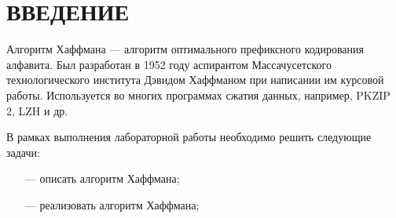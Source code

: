 \chapter*{ВВЕДЕНИЕ}

Алгоритм Хаффмана --- алгоритм оптимального префиксного кодирования алфавита. Был разработан в 1952 году аспирантом Массачусетского технологического института Дэвидом Хаффманом при написании им курсовой работы. Используется во многих программах сжатия данных, например, PKZIP 2, LZH и др. 

В рамках выполнения лабораторной работы необходимо решить следующие задачи:

\begin{itemize}
	\item[---] описать алгоритм Хаффмана;
	\item[---] реализовать алгоритм Хаффмана;
\end{itemize}

